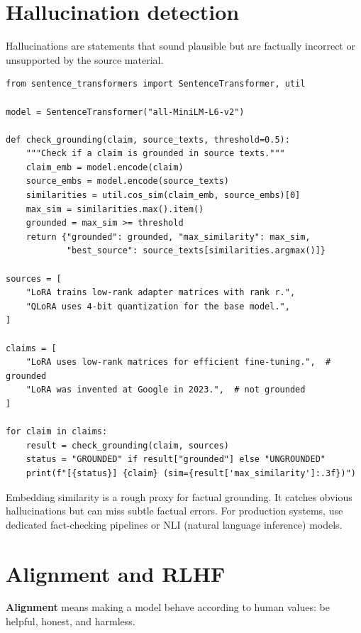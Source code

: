 \section{Hallucination detection}

Hallucinations are statements that sound plausible but are factually incorrect or unsupported by the source material.

\begin{verbatim}
from sentence_transformers import SentenceTransformer, util

model = SentenceTransformer("all-MiniLM-L6-v2")

def check_grounding(claim, source_texts, threshold=0.5):
    """Check if a claim is grounded in source texts."""
    claim_emb = model.encode(claim)
    source_embs = model.encode(source_texts)
    similarities = util.cos_sim(claim_emb, source_embs)[0]
    max_sim = similarities.max().item()
    grounded = max_sim >= threshold
    return {"grounded": grounded, "max_similarity": max_sim,
            "best_source": source_texts[similarities.argmax()]}

sources = [
    "LoRA trains low-rank adapter matrices with rank r.",
    "QLoRA uses 4-bit quantization for the base model.",
]

claims = [
    "LoRA uses low-rank matrices for efficient fine-tuning.",  # grounded
    "LoRA was invented at Google in 2023.",  # not grounded
]

for claim in claims:
    result = check_grounding(claim, sources)
    status = "GROUNDED" if result["grounded"] else "UNGROUNDED"
    print(f"[{status}] {claim} (sim={result['max_similarity']:.3f})")
\end{verbatim}

\begin{warningbox}
Embedding similarity is a rough proxy for factual grounding. It catches obvious hallucinations but can miss subtle factual errors. For production systems, use dedicated fact-checking pipelines or NLI (natural language inference) models.
\end{warningbox}

\section{Alignment and RLHF}

\textbf{Alignment} means making a model behave according to human values: be helpful, honest, and harmless.

